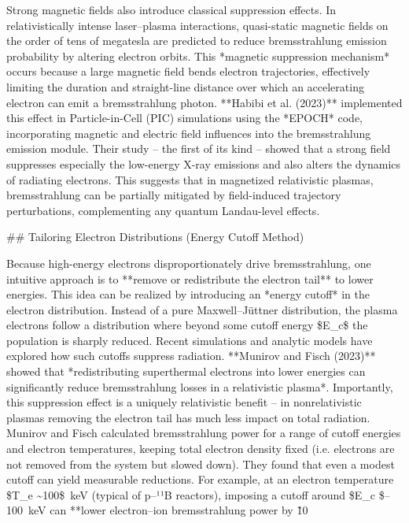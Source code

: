 \documentclass[12pt]{article}
\begin{document}
{Strong magnetic fields also introduce classical suppression effects. In relativistically intense laser–plasma interactions, quasi-static magnetic fields on the order of tens of megatesla are predicted to reduce bremsstrahlung emission probability by altering electron orbits. This *magnetic suppression mechanism* occurs because a large magnetic field bends electron trajectories, effectively limiting the duration and straight-line distance over which an accelerating electron can emit a bremsstrahlung photon. **Habibi et al. (2023)** implemented this effect in Particle-in-Cell (PIC) simulations using the *EPOCH* code, incorporating magnetic and electric field influences into the bremsstrahlung emission module. Their study – the first of its kind – showed that a strong field suppresses especially the low-energy X-ray emissions and also alters the dynamics of radiating electrons. This suggests that in magnetized relativistic plasmas, bremsstrahlung can be partially mitigated by field-induced trajectory perturbations, complementing any quantum Landau-level effects.

## Tailoring Electron Distributions (Energy Cutoff Method)

Because high-energy electrons disproportionately drive bremsstrahlung, one intuitive approach is to **remove or redistribute the electron tail** to lower energies. This idea can be realized by introducing an *energy cutoff* in the electron distribution. Instead of a pure Maxwell–Jüttner distribution, the plasma electrons follow a distribution where beyond some cutoff energy \$E\_c\$ the population is sharply reduced. Recent simulations and analytic models have explored how such cutoffs suppress radiation. **Munirov and Fisch (2023)** showed that *redistributing superthermal electrons into lower energies can significantly reduce bremsstrahlung losses in a relativistic plasma*. Importantly, this suppression effect is a uniquely relativistic benefit – in nonrelativistic plasmas removing the electron tail has much less impact on total radiation. Munirov and Fisch calculated bremsstrahlung power for a range of cutoff energies and electron temperatures, keeping total electron density fixed (i.e. electrons are not removed from the system but slowed down). They found that even a modest cutoff can yield measurable reductions. For example, at an electron temperature \$T\_e \sim 100\$ keV (typical of p–¹¹B reactors), imposing a cutoff around \$E\_c \$–100 keV can **lower electron–ion bremsstrahlung power by \~10%

}
\end{document}
